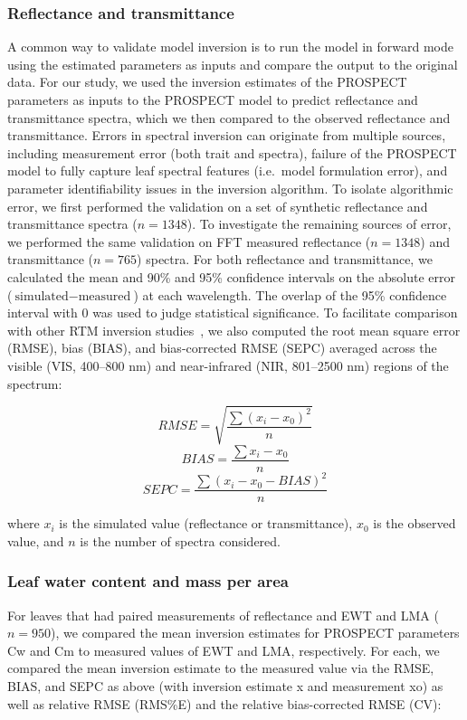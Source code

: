 \subsubsection{Reflectance and transmittance}

A common way to validate model inversion is to run the model in forward mode using the estimated parameters as inputs and compare the output to the original data.
For our study, we used the inversion estimates of the PROSPECT parameters as inputs to the PROSPECT model to predict reflectance and transmittance spectra, which we then compared to the observed reflectance and transmittance.
Errors in spectral inversion can originate from multiple sources, including measurement error (both trait and spectra), failure of the PROSPECT model to fully capture leaf spectral features (i.e.\ model formulation error), and parameter identifiability issues in the inversion algorithm.
To isolate algorithmic error, we first performed the validation on a set of synthetic reflectance and transmittance spectra ($n = 1348$).
To investigate the remaining sources of error, we performed the same validation on FFT measured reflectance ($n = 1348$) and transmittance ($n = 765$) spectra.
For both reflectance and transmittance, we calculated the mean and 90\% and 95\% confidence intervals on the absolute error ($\text{simulated} - \text{measured}$) at each wavelength.
The overlap of the 95\% confidence interval with 0 was used to judge statistical significance.
To facilitate comparison with other RTM inversion studies~\cite{feret_2008_prospect,divittorio_2009_enhancing}, we also computed the root mean square error (RMSE), bias (BIAS), and bias-corrected RMSE (SEPC) averaged across the visible (VIS, 400--800 nm) and near-infrared (NIR, 801--2500 nm) regions of the spectrum:

\[ RMSE = \sqrt{\frac{\sum{{(x_i - x_0)}^2}}{n}} \]
\[ BIAS = \frac{\sum{x_i - x_0}}{n} \]
\[ SEPC = \frac{\sum{{(x_i - x_0 - BIAS)}^2}}{n} \]

where $x_i$ is the simulated value (reflectance or transmittance), $x_0$ is the observed value, and $n$ is the number of spectra considered.

\subsubsection{Leaf water content and mass per area}

For leaves that had paired measurements of reflectance and EWT and LMA ($n = 950$), we compared the mean inversion estimates for PROSPECT parameters Cw and Cm to measured values of EWT and LMA, respectively.
For each, we compared the mean inversion estimate to the measured value via the RMSE, BIAS, and SEPC as above (with inversion estimate x and measurement xo) as well as relative RMSE (RMS\%E) and the relative bias-corrected RMSE (CV):


